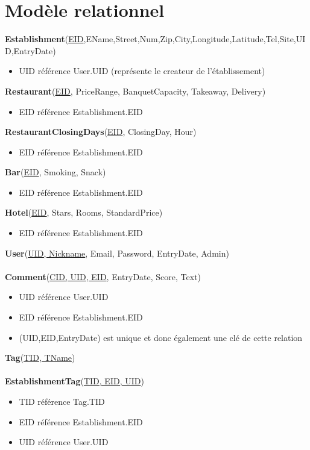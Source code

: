 \documentclass[11pt,a4paper]{report}
\begin{document}
\section*{Modèle relationnel}
\noindent
\textbf{Establishment}(\underline{EID},EName,Street,Num,Zip,City,Longitude,Latitude,Tel,Site,UID,EntryDate)
\begin{itemize}
\item UID référence User.UID (représente le createur de l'établissement)\\
\end{itemize}
\textbf{Restaurant}(\underline{EID}, PriceRange, BanquetCapacity, Takeaway, Delivery)
\begin{itemize}
\item EID référence Establishment.EID\\
\end{itemize} 
\textbf{RestaurantClosingDays}(\underline{EID}, ClosingDay, Hour)
\begin{itemize}
\item EID référence Establishment.EID\\
\end{itemize}
\textbf{Bar}(\underline{EID}, Smoking, Snack)
\begin{itemize}
\item EID référence Establishment.EID\\
\end{itemize}
\textbf{Hotel}(\underline{EID}, Stars, Rooms, StandardPrice)
\begin{itemize}
\item EID référence Establishment.EID\\
\end{itemize}
\textbf{User}(\underline{UID, Nickname}, Email, Password, EntryDate, Admin)\\ \\
\textbf{Comment}(\underline{CID, UID, EID}, EntryDate, Score,  Text)
\begin{itemize}
\item UID référence User.UID
\item EID référence Establishment.EID
\item (UID,EID,EntryDate) est unique et donc également une clé de cette relation\\
\end{itemize}
\textbf{Tag}(\underline{TID, TName})\\ \\
\textbf{EstablishmentTag}(\underline{TID, EID, UID})
\begin{itemize}
\item TID référence Tag.TID
\item EID référence Establishment.EID
\item UID référence User.UID\\
\end{itemize}
\end{document}
